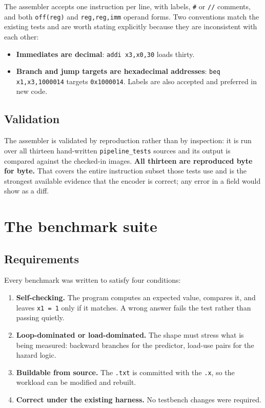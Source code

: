 \documentclass[11pt]{article}
\begin{document}
The assembler accepts one instruction per line, with labels, \texttt{\#} or
\texttt{//} comments, and both \texttt{off(reg)} and \texttt{reg,reg,imm} operand forms.
Two conventions match the existing tests and are worth stating explicitly because they
are inconsistent with each other:

\begin{itemize}
\item \textbf{Immediates are decimal}: \texttt{addi x3,x0,30} loads thirty.
\item \textbf{Branch and jump targets are hexadecimal addresses}: 
      \texttt{beq x1,x3,1000014} targets \texttt{0x1000014}. Labels are also accepted
      and preferred in new code.
\end{itemize}

\subsection{Validation}

The assembler is validated by reproduction rather than by inspection: it is run over
all thirteen hand-written \texttt{pipeline\_tests} sources and its output is compared
against the checked-in images. \textbf{All thirteen are reproduced byte for byte.} That
covers the entire instruction subset those tests use and is the strongest available
evidence that the encoder is correct; any error in a field would show as a diff.

\section{The benchmark suite}

\subsection{Requirements}

Every benchmark was written to satisfy four conditions:

\begin{enumerate}
\item \textbf{Self-checking.} The program computes an expected value, compares it, and
      leaves \texttt{x1 = 1} only if it matches. A wrong answer fails the test rather
      than passing quietly.
\item \textbf{Loop-dominated or load-dominated.} The shape must stress what is being
      measured: backward branches for the predictor, load-use pairs for the hazard
      logic.
\item \textbf{Buildable from source.} The \texttt{.txt} is committed with the
      \texttt{.x}, so the workload can be modified and rebuilt.
\item \textbf{Correct under the existing harness.} No testbench changes were required.
\end{enumerate}
\end{document}
